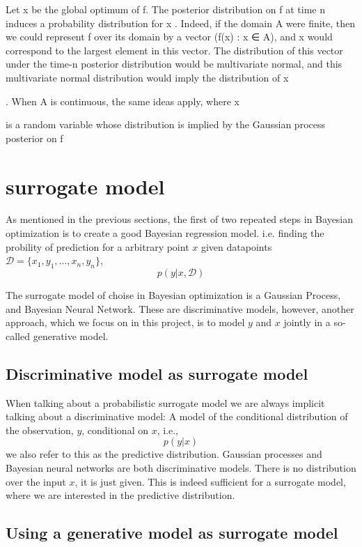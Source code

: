 Let x  be the global optimum of f. The posterior distribution on f at time n induces a probability
distribution for x
. Indeed, if the domain A were finite, then we could represent f over its domain by a
vector (f(x) : x ∈ A), and x
would correspond to the largest element in this vector. The distribution of
this vector under the time-n posterior distribution would be multivariate normal, and this multivariate
normal distribution would imply the distribution of x

. When A is continuous, the same ideas apply,
where x

is a random variable whose distribution is implied by the Gaussian process posterior on f



\section{surrogate model}
As mentioned in the previous sections, the first of two repeated steps in Bayesian optimization
is to create a good Bayesian regression model. %
i.e. finding the probility of prediction for a arbitrary point $x$ given datapoints 
$\mathcal{D} = \{x_1, y_1, \dots, x_n, y_n\}$, 
 $$p(y|x,\mathcal{D})$$

The surrogate model of choise in Bayesian optimization is a Gaussian Process, and Bayesian Neural Network.
These are discriminative models, however, another approach, which we focus on in this project, is
to model $y$ and $x$ jointly in a so-called generative model.



\subsection{Discriminative model as surrogate model}
When talking about a probabilistic surrogate model we are always implicit talking about a
discriminative model: A model of the conditional distribution of the observation, $y$, 
conditional on $x$, i.e., 
$$p(y|x)$$
we also refer to this as the predictive distribution. Gaussian processes and Bayesian neural networks
are both discriminative models. There is no distribution over the input $x$, it is just given. 
This is indeed sufficient for a surrogate model, where we are interested in the predictive distribution. 

\subsection{Using a generative model as surrogate model}

